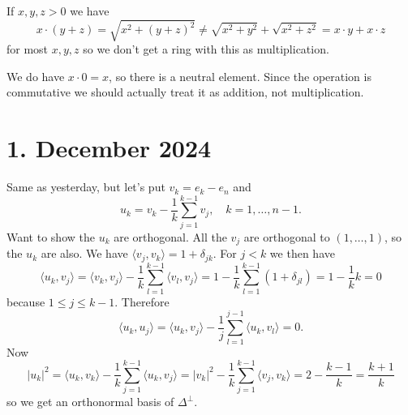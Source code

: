 \documentclass[11pt]{amsart}
\theoremstyle{definition}
\def\<{\langle}
\def\>{\rangle}
\begin{document}
If $x,y,z > 0$ we have
\[
x \cdot (y + z)
= \sqrt{x^2 + (y+z)^2}
\not= \sqrt{x^2 + y^2} + \sqrt{x^2 + z^2}
= x \cdot y + x \cdot z
\]
for most $x,y,z$ so we don't get a ring with this as multiplication.

We do have $x \cdot 0 = x$, so there is a neutral element.
Since the operation is commutative we should actually treat it as addition, not multiplication.


\section{1. December 2024}

Same as yesterday, but let's put $v_k = e_k - e_n$ and
\[
u_k = v_k - \frac1k \sum_{j=1}^{k-1} v_j,
\quad
k = 1,\ldots,n-1.
\]
Want to show the $u_k$ are orthogonal.
All the $v_j$ are orthogonal to $(1,\ldots,1)$, so the $u_k$ are also.
We have $\<v_j, v_k \> = 1 + \delta_{jk}$.
For $j < k$ we then have
\[
\<u_k, v_j \>
= \<v_k, v_j \> - \frac1k \sum_{l=1}^{k-1} \<v_l, v_j\>
= 1 - \frac1k \sum_{l=1}^{k-1} ( 1 + \delta_{jl} )
= 1 - \frac1k k
= 0
\]
because $1 \leq j \leq k-1$.
Therefore
\[
\<u_k, u_j \>
= \<u_k, v_j \> - \frac1j \sum_{l=1}^{j-1} \<u_k, v_l\>
= 0.
\]
Now
\[
|u_k|^2
= \<u_k, v_k \> - \frac1k \sum_{j=1}^{k-1} \<u_k, v_j\>
= |v_k|^2 - \frac1k \sum_{j=1}^{k-1} \<v_j, v_k\>
= 2 - \frac{k-1}{k}
= \frac{k + 1}{k}
\]
so we get an orthonormal basis of $\Delta^\perp$.
\end{document}
